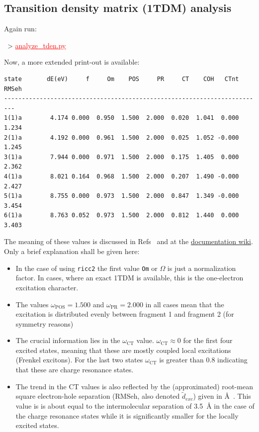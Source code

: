 \documentclass[DIV=12,headings=normal]{scrartcl}
\newcommand{\redl}[1]{{\textcolor{red}{\underline{#1}}}}
\newcommand{\om}[1]{\omega_{\textrm{#1}}}
\newcommand{\comm}[1]{
\small
~> \redl{#1}
\normalsize
}
\begin{document}
\subsection{Transition density matrix (1TDM) analysis}

Again run:

\comm{analyze\_tden.py}

Now, a more extended print-out is available:

\scriptsize
\begin{Verbatim}[commandchars=\\\{\}]
state       dE(eV)     f     Om    POS     PR     CT    COH   CTnt  RMSeh
-------------------------------------------------------------------------
1(1)a        4.174 0.000  0.950  1.500  2.000  0.020  1.041  0.000  1.234
2(1)a        4.192 0.000  0.961  1.500  2.000  0.025  1.052 -0.000  1.245
3(1)a        7.944 0.000  0.971  1.500  2.000  0.175  1.405  0.000  2.362
4(1)a        8.021 0.164  0.968  1.500  2.000  0.207  1.490 -0.000  2.427
5(1)a        8.755 0.000  0.973  1.500  2.000  0.847  1.349 -0.000  3.454
6(1)a        8.763 0.052  0.973  1.500  2.000  0.812  1.440  0.000  3.403
\end{Verbatim}
\normalsize

The meaning of these values is discussed in Refs~\cite{DMAT, DMAT_ADC_II} and at the \href{https://sourceforge.net/p/theodore-qc/wiki/Transition density matrix analysis/}{documentation wiki}. Only a brief explanation shall be given here:

\begin{itemize}
\item
In the case of using \texttt{ricc2} the first value \texttt{Om} or $\Omega$ is just a normalization factor.
In cases, where an exact 1TDM is available, this is the one-electron excitation character.
\item
The values $\om{POS}=1.500$ and $\om{PR}=2.000$ in all cases mean that the excitation is distributed evenly between fragment 1 and fragment 2 (for symmetry reasons)
\item
The crucial information lies in the $\om{CT}$ value. $\om{CT}\approx 0$ for the first four excited states, meaning that these are mostly coupled local excitations (Frenkel excitons). For the last two states $\om{CT}$ is greater than 0.8 indicating that these are charge resonance states.
\item
The trend in the CT values is also reflected by the (approximated) root-mean square electron-hole separation (RMSeh, also denoted $\tilde{d}_{exc}$) given in \AA~\cite{PPV_Steffi}.
This value is is about equal to the intermolecular separation of 3.5~\AA{} in the case of the charge resonance states while it is significantly smaller for the locally excited states.
\end{itemize}
\end{document}
